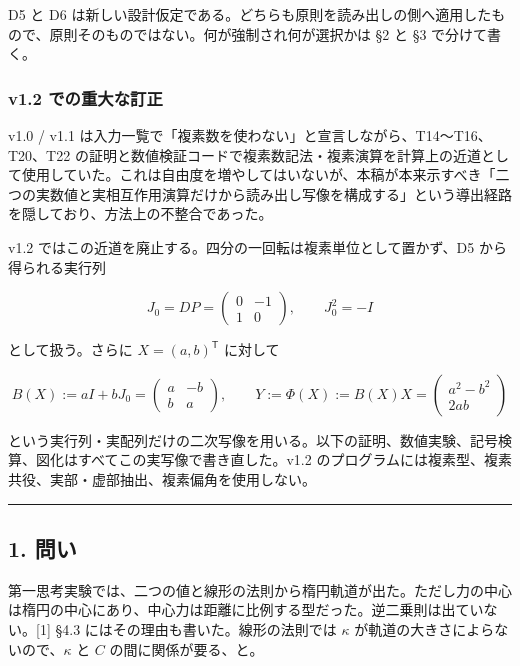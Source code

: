 \documentclass[
  a4paper,
]{ltjsarticle}
\begin{document}
D5 と D6
は新しい設計仮定である。どちらも原則を読み出しの側へ適用したもので、原則そのものではない。何が強制され何が選択かは
§2 と §3 で分けて書く。

\subsubsection{v1.2
での重大な訂正}\label{v1.2-ux3067ux306eux91cdux5927ux306aux8a02ux6b63}

v1.0 / v1.1
は入力一覧で「複素数を使わない」と宣言しながら、T14〜T16、T20、T22
の証明と数値検証コードで複素数記法・複素演算を計算上の近道として使用していた。これは自由度を増やしてはいないが、本稿が本来示すべき「二つの実数値と実相互作用演算だけから読み出し写像を構成する」という導出経路を隠しており、方法上の不整合であった。

v1.2 ではこの近道を廃止する。四分の一回転は複素単位として置かず、D5
から得られる実行列

\[
J_0=DP=\begin{pmatrix}0&-1\\1&0\end{pmatrix},\qquad J_0^2=-I
\]

として扱う。さらに \(X=(a,b)^{\mathsf T}\) に対して

\[
B(X):=aI+bJ_0=\begin{pmatrix}a&-b\\b&a\end{pmatrix},\qquad
\boxed{Y:=\Phi(X):=B(X)X=\begin{pmatrix}a^2-b^2\\2ab\end{pmatrix}}
\]

という実行列・実配列だけの二次写像を用いる。以下の証明、数値実験、記号検算、図化はすべてこの実写像で書き直した。v1.2
のプログラムには複素型、複素共役、実部・虚部抽出、複素偏角を使用しない。

\begin{center}\rule{0.5\linewidth}{0.5pt}\end{center}

\subsection{1. 問い}\label{ux554fux3044}

第一思考実験では、二つの値と線形の法則から楕円軌道が出た。ただし力の中心は楕円の中心にあり、中心力は距離に比例する型だった。逆二乗則は出ていない。{[}1{]}
§4.3 にはその理由も書いた。線形の法則では \(\kappa\)
が軌道の大きさによらないので、\(\kappa\) と \(C\) の間に関係が要る、と。
\end{document}
